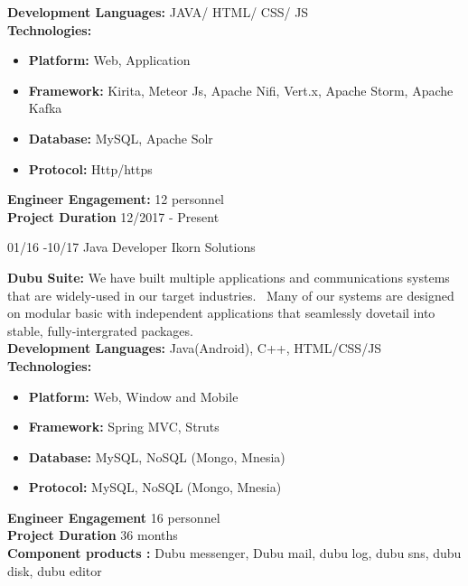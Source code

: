 \documentclass[]{friggeri-cv}
\begin{document}
\begin{entrylist}
\entry
{}
{}
{}
	{ \textbf{Development Languages:} JAVA/ HTML/ CSS/ JS~\\
	 \textbf{Technologies:}~
			\begin{itemize}
				\item \textbf{Platform:}  Web, Application
				\item \textbf{Framework:} Kirita, Meteor Js, Apache Nifi,  Vert.x, Apache Storm, Apache Kafka  
				\item \textbf{Database:} MySQL, Apache Solr
				\item \textbf{Protocol:} Http/https
			\end{itemize}
	 \textbf{Engineer Engagement:} 12 personnel\\
	 \textbf{Project Duration} 12/2017 - Present~
	}
\end{entrylist}

\begin{entrylist}
  \entry
    {01/16 -10/17}
    {Java Developer}
    {Ikorn Solutions}
   {\textbf{ Dubu Suite:} We have built multiple applications and communications systems that are widely-used in our target industries.~
	 Many of our systems are designed on modular basic with independent applications that seamlessly dovetail into stable, fully-intergrated packages.\\

	 \textbf{Development Languages:} Java(Android), C++, HTML/CSS/JS\\
	 \textbf{Technologies:}~
			\begin{itemize}
				\item \textbf{Platform:} Web, Window and Mobile
				\item \textbf{Framework:} Spring MVC, Struts
				\item \textbf{Database:} MySQL, NoSQL (Mongo, Mnesia)
				\item \textbf{Protocol:} MySQL, NoSQL (Mongo, Mnesia)
			\end{itemize}
		 \textbf{Engineer Engagement} 16 personnel\\
		 \textbf{Project Duration} 36 months\\
		 \textbf{Component products :} Dubu messenger, Dubu mail, dubu log, dubu sns, dubu disk, dubu editor\\
}
\end{entrylist}
\end{document}
